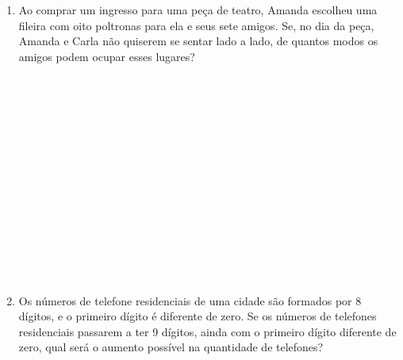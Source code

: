 \documentclass[a4paper,14pt]{article}
\begin{document}
\begin{multicols}{2}
\begin{enumerate}
	        \item Ao comprar um ingresso para uma peça de teatro, Amanda escolheu uma fileira com oito poltronas para ela e seus sete amigos. Se, no dia da peça, Amanda e Carla não quiserem se sentar lado a lado, de quantos modos os amigos podem ocupar esses lugares? \\\\\\\\\\\\\\\\\\\\\\\\\\\\\\
	        \item Os números de telefone residenciais de uma cidade são formados por 8 dígitos, e o primeiro dígito é diferente de zero. Se os números de telefones residenciais passarem a ter 9 dígitos, ainda com o primeiro dígito diferente de zero, qual será o aumento possível na quantidade de telefones?
        \end{enumerate}
    $~$ \\ $~$ \\ $~$ \\ $~$ \\ $~$ \\ $~$ \\ $~$ \\ $~$ \\ $~$ \\ $~$ \\ $~$ \\ $~$ \\ $~$ \\ $~$ \\ $~$ \\ $~$ \\ $~$ \\ $~$ \\ $~$ \\ $~$ \\ $~$ \\ $~$ \\ $~$ \\ $~$ \\ $~$ \\ $~$ \\ $~$ \\ $~$ \\ $~$ \\ $~$ \\ $~$
    \end{multicols}
\end{document}
